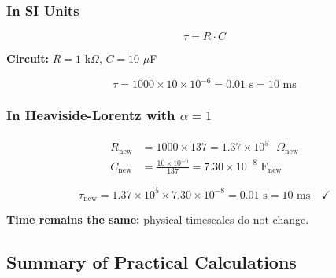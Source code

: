 	\subsubsection{In SI Units}
	
	\begin{equation}
		\tau = R \cdot C
	\end{equation}
	
	\textbf{Circuit:} $R = 1$ k$\Omega$, $C = 10$ $\mu$F
	
	\begin{equation}
		\tau = 1000 \times 10 \times 10^{-6} = 0.01 \text{ s} = 10 \text{ ms}
	\end{equation}
	
	\subsubsection{In Heaviside-Lorentz with $\alpha = 1$}
	
	\begin{align}
		R_{\text{new}} &= 1000 \times 137 = 1.37 \times 10^{5} \text{ }\Omega_{\text{new}} \\
		C_{\text{new}} &= \frac{10 \times 10^{-6}}{137} = 7.30 \times 10^{-8} \text{ F}_{\text{new}}
	\end{align}
	
	\begin{equation}
		\tau_{\text{new}} = 1.37 \times 10^{5} \times 7.30 \times 10^{-8} = 0.01 \text{ s} = 10 \text{ ms} \quad \checkmark
	\end{equation}
	
	\textbf{Time remains the same:} physical timescales do not change.
	
	\subsection{Summary of Practical Calculations}
	
	\begin{table}[h]
		\centering
		\caption{Conversion factors SI → HL with $\alpha = 1$ (factors for the units; numerical values are divided by the factor)}
	\end{table}
	
